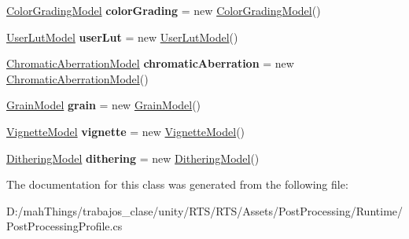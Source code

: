 \begin{DoxyCompactItemize}
\mbox{\hyperlink{class_unity_engine_1_1_post_processing_1_1_color_grading_model}{Color\+Grading\+Model}} {\bfseries color\+Grading} = new \mbox{\hyperlink{class_unity_engine_1_1_post_processing_1_1_color_grading_model}{Color\+Grading\+Model}}()
\item 
\mbox{\label{class_unity_engine_1_1_post_processing_1_1_post_processing_profile_ad7bc8c3d05a8c92bb48c3766181ddd93}} 
\mbox{\hyperlink{class_unity_engine_1_1_post_processing_1_1_user_lut_model}{User\+Lut\+Model}} {\bfseries user\+Lut} = new \mbox{\hyperlink{class_unity_engine_1_1_post_processing_1_1_user_lut_model}{User\+Lut\+Model}}()
\item 
\mbox{\label{class_unity_engine_1_1_post_processing_1_1_post_processing_profile_a142138c77a670d153c04da81fc8dcff5}} 
\mbox{\hyperlink{class_unity_engine_1_1_post_processing_1_1_chromatic_aberration_model}{Chromatic\+Aberration\+Model}} {\bfseries chromatic\+Aberration} = new \mbox{\hyperlink{class_unity_engine_1_1_post_processing_1_1_chromatic_aberration_model}{Chromatic\+Aberration\+Model}}()
\item 
\mbox{\label{class_unity_engine_1_1_post_processing_1_1_post_processing_profile_ab2048238d01e1b60a859755167fae28a}} 
\mbox{\hyperlink{class_unity_engine_1_1_post_processing_1_1_grain_model}{Grain\+Model}} {\bfseries grain} = new \mbox{\hyperlink{class_unity_engine_1_1_post_processing_1_1_grain_model}{Grain\+Model}}()
\item 
\mbox{\label{class_unity_engine_1_1_post_processing_1_1_post_processing_profile_abee3b27a6acda75032c825ce759f2838}} 
\mbox{\hyperlink{class_unity_engine_1_1_post_processing_1_1_vignette_model}{Vignette\+Model}} {\bfseries vignette} = new \mbox{\hyperlink{class_unity_engine_1_1_post_processing_1_1_vignette_model}{Vignette\+Model}}()
\item 
\mbox{\label{class_unity_engine_1_1_post_processing_1_1_post_processing_profile_aa72f3687adc37b27032d21e3649001e3}} 
\mbox{\hyperlink{class_unity_engine_1_1_post_processing_1_1_dithering_model}{Dithering\+Model}} {\bfseries dithering} = new \mbox{\hyperlink{class_unity_engine_1_1_post_processing_1_1_dithering_model}{Dithering\+Model}}()
\end{DoxyCompactItemize}


The documentation for this class was generated from the following file\+:\begin{DoxyCompactItemize}
\item 
D\+:/mah\+Things/trabajos\+\_\+clase/unity/\+R\+T\+S/\+R\+T\+S/\+Assets/\+Post\+Processing/\+Runtime/Post\+Processing\+Profile.\+cs\end{DoxyCompactItemize}
